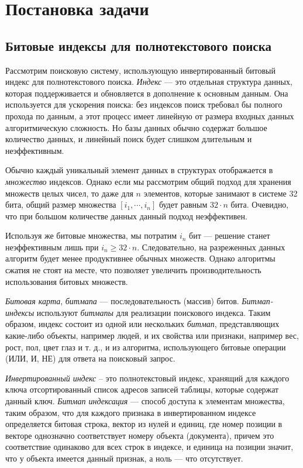 \newpage
\section{Постановка задачи}

\subsection{Битовые индексы для полнотекстового поиска}

Рассмотрим поисковую систему, использующую инвертированный битовый индекс
для полнотекстового поиска. \textit{Индекс} — это отдельная структура данных,
которая поддерживается и обновляется в дополнение к основным данным.
Она используется для ускорения поиска: без индексов поиск требовал бы полного
прохода по данным, а этот процесс имеет линейную от размера входных данных
алгоритмическую сложность. Но базы данных обычно содержат большое количество
данных, и линейный поиск будет слишком длительным и неэффективным.

Обычно каждый уникальный элемент данных в структурах отображается в \textit{множество}
индексов. Однако если мы рассмотрим общий подход для хранения множеств целых
чисел, то даже для $n$ элементов, которые занимают в системе 32 бита, общий
размер множества $[i_1, \cdots, i_{n}]$ будет равным $32 \cdot n$ бита.
Очевидно, что при большом количестве данных данный подход неэффективен.

Используя же битовые множества, мы потратим $i_{n}$ бит — решение станет
неэффективным лишь при $i_{n} \ge 32 \cdot n $. Следовательно, на разреженных
данных алгоритм будет менее продуктивнее обычных множеств. Однако алгоритмы
сжатия не стоят на месте, что позволяет увеличить производительность использования
битовых множеств.

\textit{Битовая карта}, \textit{битмапа} — последовательность (массив) битов.
\textit{Битмап-индексы} используют \textit{битмапы} для реализации поискового
индекса. Таким образом, индекс состоит из одной или нескольких \textit{битмап},
представляющих какие-либо объекты, например людей, и их свойства
или признаки, например вес, рост, пол, цвет глаз и т. д., и из алгоритма,
использующего битовые операции (ИЛИ, И, НЕ) для ответа на поисковый запрос.

\textit{Инвертированный индекс} – это полнотекстовый индекс, хранящий для каждого
ключа отсортированный список адресов записей таблицы, которые содержат данный ключ.
\textit{Битмап индексация} — способ доступа к элементам множества, таким образом,
что для каждого признака в инвертированном индексе определяется битовая
строка, вектор из нулей и единиц, где номер позиции в векторе однозначно
соответствует номеру объекта (документа), причем это соответствие одинаково для
всех строк в индексе, и единица на позиции значит, что у объекта имеется данный 
признак, а ноль — что отсутствует.

